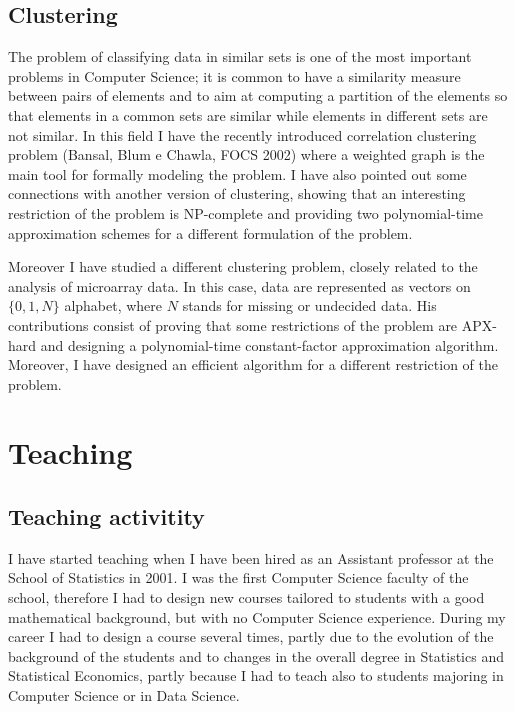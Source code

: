 \documentclass[11pt,a4paper,roman]{moderncv}
\begin{document}
\subsection{Clustering}\label{clustering}

The problem of classifying data in similar sets is one of the most
important problems in Computer Science; it is common to have a
similarity measure between pairs of elements and to aim at computing a
partition of the elements so that elements in a common sets are similar
while elements in different sets are not similar. In this field
I have the recently introduced correlation clustering
problem (Bansal, Blum e Chawla, FOCS 2002) where a weighted graph is the
main tool for formally modeling the problem. I have also pointed out
some connections with another version of clustering, showing that an
interesting restriction of the problem is NP-complete and providing two
polynomial-time approximation schemes for a different formulation of the
problem.

Moreover I have studied a different clustering problem, closely related
to the analysis of microarray data. In this case, data are represented
as vectors on \(\{0,1,N\}\) alphabet, where \(N\) stands for missing or
undecided data. His contributions consist of proving that some
restrictions of the problem are APX-hard and designing a polynomial-time
constant-factor approximation algorithm. Moreover, I have designed an
efficient algorithm for a different restriction of the problem.

\section{Teaching}


  \subsection{Teaching activitity}

  I have started teaching when I have been hired as an Assistant professor at
  the School of Statistics in 2001.
  I was the first Computer Science faculty of the school, therefore I had to
  design new courses tailored to students with a good mathematical background,
  but with no Computer Science experience.
  During my career I had to design a course several times, partly due to the
  evolution of the background of the students and to changes in the overall
  degree in Statistics and Statistical Economics, partly because I had to teach
  also to students majoring in Computer Science or in Data Science.
\end{document}
